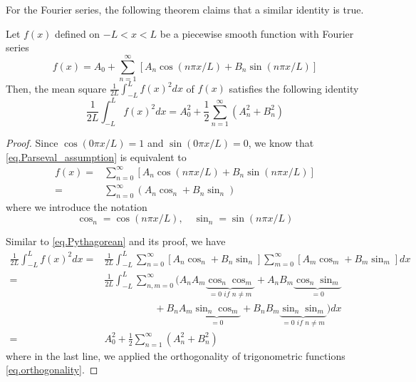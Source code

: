 For the Fourier series, the following theorem claims that a similar identity is true.

\begin{theorem}\label{th.Parseval}
    Let $f(x)$ defined on $-L<x<L$ be a piecewise smooth function with Fourier series 
    \begin{equation}\label{eq.Parseval_assumption}
        f(x) = A_0+\sum_{n=1}^{\infty}[A_n \cos (n \pi x / L)+B_n \sin (n \pi x / L)]
    \end{equation}
    Then, the mean square $\frac{1}{2 L} \int_{-L}^L f(x)^2 d x$ of $f(x)$ satisfies the following identity
    \begin{equation}\label{eq.Parseval_fourier}
        \frac{1}{2 L} \int_{-L}^L f(x)^2 d x=A_0^2+\frac{1}{2} \sum_{n=1}^{\infty}\left(A_n^2+B_n^2\right)
    \end{equation}
\end{theorem}
\begin{proof}
    Since $\cos (0 \pi x / L) = 1$ and $\sin (0 \pi x / L) = 0$, we know that \eqref{eq.Parseval_assumption} is equivalent to 
    \begin{equation}\label{eq.proof_Parseval_1}
        \begin{split}
            f(x) =& \sum_{n=0}^{\infty}[A_n \cos (n \pi x / L)+B_n \sin (n \pi x / L)]
            \\
            =&\sum_{n=0}^{\infty}(A_n \cos_n +B_n \sin_n)
        \end{split}
    \end{equation}
    where we introduce the notation
    \begin{equation}\label{eq.proof_Parseval_2}
        \cos_n = \cos (n \pi x / L),\quad \sin_n = \sin (n \pi x / L)
    \end{equation}

    Similar to \eqref{eq.Pythagorean} and its proof, we have 
    \begin{equation}\label{eq.proof_Parseval_3}
        \begin{split}
            \frac{1}{2 L} \int_{-L}^L f(x)^2 d x 
            =& \frac{1}{2 L} \int_{-L}^L \sum_{n=0}^{\infty}[A_n \cos_n+B_n \sin_n] \sum_{m=0}^{\infty}[A_m \cos_m+B_m \sin_m] d x
            \\
            =&\frac{1}{2 L} \int_{-L}^L \sum_{n,m=0}^{\infty}(A_nA_m \underbrace{\cos_n\cos_m}_{= 0\textit{ if }n\neq m} + A_nB_m\underbrace{\cos_n\sin_m}_{=0} 
            \\
            &\qquad\qquad\quad+ B_nA_m\underbrace{\sin_n\cos_m}_{=0} + B_nB_m\underbrace{\sin_n\sin_m}_{= 0\textit{ if }n\neq m}) d x
            \\
            =&A_0^2+\frac{1}{2} \sum_{n=1}^{\infty}\left(A_n^2+B_n^2\right)
        \end{split}
    \end{equation}
    where in the last line, we applied the orthogonality of trigonometric functions \eqref{eq.orthogonality}.
\end{proof}


